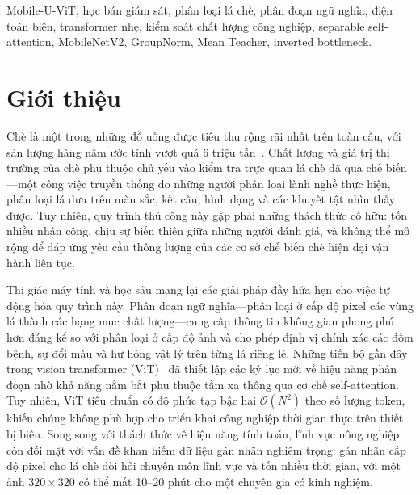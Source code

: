 \documentclass[conference]{IEEEtran}
\begin{document}
\begin{IEEEkeywords}
Mobile-U-ViT, học bán giám sát, phân loại lá chè, phân đoạn ngữ nghĩa, điện toán biên, transformer nhẹ, kiểm soát chất lượng công nghiệp, separable self-attention, MobileNetV2, GroupNorm, Mean Teacher, inverted bottleneck.
\end{IEEEkeywords}


\section{Giới thiệu}

Chè là một trong những đồ uống được tiêu thụ rộng rãi nhất trên toàn cầu, với sản lượng hàng năm ước tính vượt quá 6 triệu tấn~\cite{b1}. Chất lượng và giá trị thị trường của chè phụ thuộc chủ yếu vào kiểm tra trực quan lá chè đã qua chế biến---một công việc truyền thống do những người phân loại lành nghề thực hiện, phân loại lá dựa trên màu sắc, kết cấu, hình dạng và các khuyết tật nhìn thấy được. Tuy nhiên, quy trình thủ công này gặp phải những thách thức cố hữu: tốn nhiều nhân công, chịu sự biến thiên giữa những người đánh giá, và không thể mở rộng để đáp ứng yêu cầu thông lượng của các cơ sở chế biến chè hiện đại vận hành liên tục.

Thị giác máy tính và học sâu mang lại các giải pháp đầy hứa hẹn cho việc tự động hóa quy trình này. Phân đoạn ngữ nghĩa---phân loại ở cấp độ pixel các vùng lá thành các hạng mục chất lượng---cung cấp thông tin không gian phong phú hơn đáng kể so với phân loại ở cấp độ ảnh và cho phép định vị chính xác các đốm bệnh, sự đổi màu và hư hỏng vật lý trên từng lá riêng lẻ. Những tiến bộ gần đây trong vision transformer (ViT)~\cite{b2} đã thiết lập các kỷ lục mới về hiệu năng phân đoạn nhờ khả năng nắm bắt phụ thuộc tầm xa thông qua cơ chế self-attention. Tuy nhiên, ViT tiêu chuẩn có độ phức tạp bậc hai $\mathcal{O}(N^2)$ theo số lượng token, khiến chúng không phù hợp cho triển khai công nghiệp thời gian thực trên thiết bị biên. Song song với thách thức về hiệu năng tính toán, lĩnh vực nông nghiệp còn đối mặt với vấn đề khan hiếm dữ liệu gán nhãn nghiêm trọng: gán nhãn cấp độ pixel cho lá chè đòi hỏi chuyên môn lĩnh vực và tốn nhiều thời gian, với một ảnh $320 \times 320$ có thể mất 10--20 phút cho một chuyên gia có kinh nghiệm.
\end{document}
